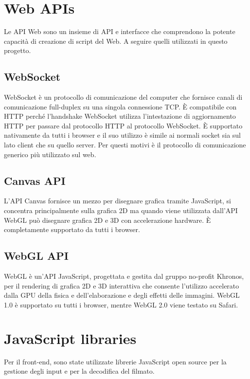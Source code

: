 \section{Web APIs}
Le API Web sono un insieme di API e interfacce che comprendono la potente capacità di creazione di script del Web. A seguire quelli utilizzati in questo progetto\cite{Web_APIs}.

\subsection{WebSocket}
WebSocket è un protocollo di comunicazione del computer che fornisce canali di comunicazione full-duplex su una singola connessione TCP. È compatibile con HTTP perché l'handshake WebSocket utilizza l'intestazione di aggiornamento HTTP per passare dal protocollo HTTP al protocollo WebSocket. È supportato nativamente da tutti i browser e il suo utilizzo è simile ai normali socket sia sul lato client che su quello server. Per questi motivi è il protocollo di comunicazione generico più utilizzato sul web\cite{WebSocket_Web_APIs}.

\subsection{Canvas API}
L'API Canvas fornisce un mezzo per disegnare grafica tramite JavaScript, si concentra principalmente sulla grafica 2D ma quando viene utilizzata dall'API WebGL può disegnare grafica 2D e 3D con accelerazione hardware. È completamente supportato da tutti i browser\cite{Canvas_API}.

\subsection{WebGL API}
WebGL è un'API JavaScript, progettata e gestita dal gruppo no-profit Khronos, per il rendering di grafica 2D e 3D interattiva che consente l'utilizzo accelerato dalla GPU della fisica e dell'elaborazione e degli effetti delle immagini. WebGL 1.0 è supportato su tutti i browser, mentre WebGL 2.0 viene testato su Safari\cite{WebGL}.



\section{JavaScript libraries}
Per il front-end, sono state utilizzate librerie JavaScript open source per la gestione degli input e per la decodifica del filmato.

